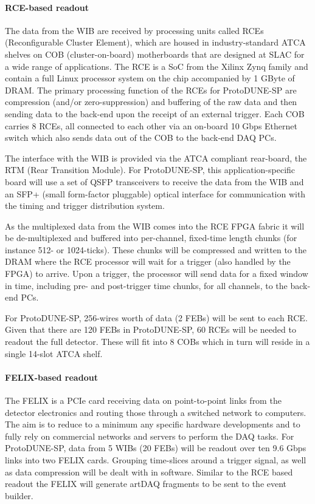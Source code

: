 \paragraph{RCE-based readout}
The data from the WIB are received by processing units called RCEs (Reconfigurable Cluster Element), 
\cite{slac:rce}
which are housed in industry-standard
ATCA shelves on COB (cluster-on-board) motherboards that are designed
at SLAC for a wide range of applications.   The RCE is a SoC 
from the
Xilinx Zynq family and contain a full Linux processor system on the chip
accompanied by 1 GByte of DRAM.   The primary processing function of the
RCEs for ProtoDUNE-SP are compression (and/or zero-suppression) and buffering
of the raw data and then sending data to the back-end upon the receipt of
an external trigger.  Each COB carries 8 RCEs, all connected to each
other via an on-board 10 Gbps Ethernet switch which also sends data out
of the COB to the back-end DAQ PCs.

The interface with the WIB is provided via the ATCA compliant rear-board, the RTM (Rear Transition Module).  
For ProtoDUNE-SP, this application-specific board will use a set of QSFP transceivers to receive
the data from the WIB and an SFP+ (small form-factor pluggable)
 optical interface for communication
with the timing and trigger distribution system.

As the multiplexed data from the WIB comes into the RCE FPGA fabric
it will be de-multiplexed and buffered into per-channel, fixed-time
length chunks (for instance 512- or 1024-ticks).  These chunks will be
compressed and written to the DRAM where the RCE processor will wait
for a trigger (also handled by the FPGA) to arrive.  Upon a trigger, the
processor will send data for a fixed window in time, including pre- and post-trigger time chunks,
for all channels, to the back-end PCs.  

For ProtoDUNE-SP, 256-wires worth of data (2 FEBs) will be sent to each RCE.
Given that there are 120 FEBs in ProtoDUNE-SP, 60 RCEs will be needed to
readout the full detector.  These will fit into 8 COBs which in turn
will reside in a single 14-slot ATCA shelf.

\paragraph{FELIX-based readout}
The FELIX is a PCIe card receiving data on point-to-point links from
the detector electronics and routing those through a switched network
to computers.  The aim is to reduce to a minimum any specific hardware
developments and to fully rely on commercial networks and servers to
perform the DAQ tasks.  For ProtoDUNE-SP, data from 5 WIBs (20 FEBs) will
be readout over ten 9.6 Gbps links into two FELIX cards.  Grouping
time-slices around a trigger signal, as well as data compression will be
dealt with in software. Similar to the RCE based readout the FELIX will
generate artDAQ fragments to be sent to the event builder.


